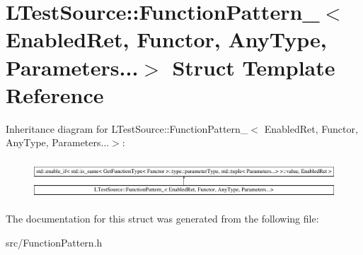 \hypertarget{struct_l_test_source_1_1_function_pattern___3_01_enabled_ret_00_01_functor_00_01_any_type_00_01_parameters_8_8_8_4}{\section{L\-Test\-Source\-:\-:Function\-Pattern\-\_\-$<$ Enabled\-Ret, Functor, Any\-Type, Parameters...$>$ Struct Template Reference}
\label{struct_l_test_source_1_1_function_pattern___3_01_enabled_ret_00_01_functor_00_01_any_type_00_01_parameters_8_8_8_4}
}
Inheritance diagram for L\-Test\-Source\-:\-:Function\-Pattern\-\_\-$<$ Enabled\-Ret, Functor, Any\-Type, Parameters...$>$\-:\begin{figure}[H]
\begin{center}
\leavevmode
\includegraphics[height=1.479524cm]{struct_l_test_source_1_1_function_pattern___3_01_enabled_ret_00_01_functor_00_01_any_type_00_01_parameters_8_8_8_4}
\end{center}
\end{figure}


The documentation for this struct was generated from the following file\-:\begin{DoxyCompactItemize}
\item 
src/Function\-Pattern.\-h\end{DoxyCompactItemize}

